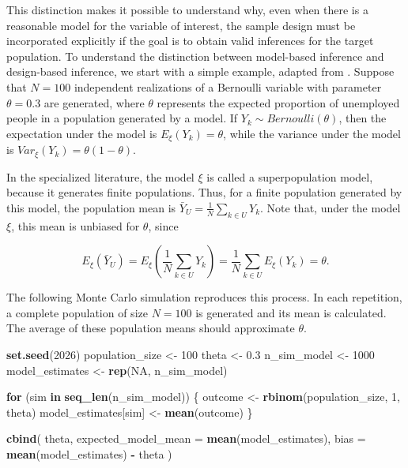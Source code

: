 \documentclass[
  english,
  12pt,
]{book}
\newenvironment{Shaded}{\begin{snugshade}}{\end{snugshade}}
\newcommand{\AttributeTok}[1]{\textcolor[rgb]{0.13,0.29,0.53}{#1}}
\newcommand{\ConstantTok}[1]{\textcolor[rgb]{0.56,0.35,0.01}{#1}}
\newcommand{\ControlFlowTok}[1]{\textcolor[rgb]{0.13,0.29,0.53}{\textbf{#1}}}
\newcommand{\DecValTok}[1]{\textcolor[rgb]{0.00,0.00,0.81}{#1}}
\newcommand{\FloatTok}[1]{\textcolor[rgb]{0.00,0.00,0.81}{#1}}
\newcommand{\FunctionTok}[1]{\textcolor[rgb]{0.13,0.29,0.53}{\textbf{#1}}}
\newcommand{\NormalTok}[1]{#1}
\newcommand{\OtherTok}[1]{\textcolor[rgb]{0.56,0.35,0.01}{#1}}
\newcommand{\SpecialCharTok}[1]{\textcolor[rgb]{0.81,0.36,0.00}{\textbf{#1}}}
\begin{document}
This distinction makes it possible to understand why, even when there is a reasonable model for the variable of interest, the sample design must be incorporated explicitly if the goal is to obtain valid inferences for the target population. To understand the distinction between model-based inference and design-based inference, we start with a simple example, adapted from \citet{binder2011estimating}. Suppose that \(N=100\) independent realizations of a Bernoulli variable with parameter \(\theta=0.3\) are generated, where \(\theta\) represents the expected proportion of unemployed people in a population generated by a model. If \(Y_k \sim Bernoulli(\theta)\), then the expectation under the model is \(E_{\xi}(Y_k) = \theta\), while the variance under the model is \(Var_{\xi}(Y_k) = \theta(1-\theta)\).

In the specialized literature, the model \(\xi\) is called a superpopulation model, because it generates finite populations. Thus, for a finite population generated by this model, the population mean is \(\bar{Y}_U = \frac{1}{N}\sum_{k \in U}Y_k\). Note that, under the model \(\xi\), this mean is unbiased for \(\theta\), since

\[
E_{\xi}(\bar{Y}_U) =
E_{\xi}\left(\frac{1}{N}\sum_{k \in U}Y_k\right)
= \frac{1}{N}\sum_{k \in U}E_{\xi}(Y_k)
= \theta.
\]

The following Monte Carlo simulation reproduces this process. In each repetition, a complete population of size \(N=100\) is generated and its mean is calculated. The average of these population means should approximate \(\theta\).

\begin{Shaded}
\begin{Highlighting}[]
\FunctionTok{set.seed}\NormalTok{(}\DecValTok{2026}\NormalTok{)}
\NormalTok{population\_size }\OtherTok{\textless{}{-}} \DecValTok{100}
\NormalTok{theta }\OtherTok{\textless{}{-}} \FloatTok{0.3}
\NormalTok{n\_sim\_model }\OtherTok{\textless{}{-}} \DecValTok{1000}
\NormalTok{model\_estimates }\OtherTok{\textless{}{-}} \FunctionTok{rep}\NormalTok{(}\ConstantTok{NA}\NormalTok{, n\_sim\_model)}

\ControlFlowTok{for}\NormalTok{ (sim }\ControlFlowTok{in} \FunctionTok{seq\_len}\NormalTok{(n\_sim\_model)) \{}
\NormalTok{  outcome }\OtherTok{\textless{}{-}} \FunctionTok{rbinom}\NormalTok{(population\_size, }\DecValTok{1}\NormalTok{, theta)}
\NormalTok{  model\_estimates[sim] }\OtherTok{\textless{}{-}} \FunctionTok{mean}\NormalTok{(outcome)}
\NormalTok{\}}

\FunctionTok{cbind}\NormalTok{(}
\NormalTok{  theta,}
  \AttributeTok{expected\_model\_mean =} \FunctionTok{mean}\NormalTok{(model\_estimates),}
  \AttributeTok{bias =} \FunctionTok{mean}\NormalTok{(model\_estimates) }\SpecialCharTok{{-}}\NormalTok{ theta}
\NormalTok{)}
\end{Highlighting}
\end{Shaded}
\end{document}
